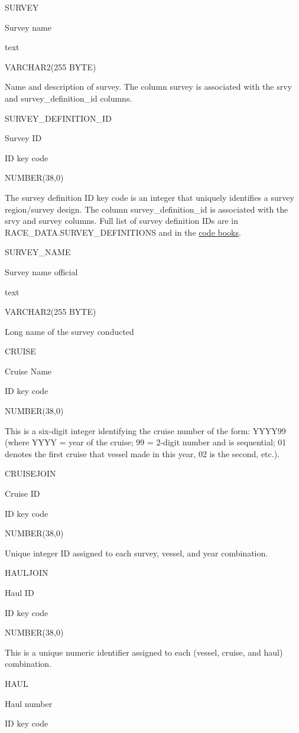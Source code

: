 \documentclass[
  letterpaper,
  oneside,
  open=any]{scrbook}
\begin{document}
SURVEY

Survey name

text

VARCHAR2(255 BYTE)

Name and description of survey. The column survey is associated with the
srvy and survey\_definition\_id columns.

SURVEY\_DEFINITION\_ID

Survey ID

ID key code

NUMBER(38,0)

The survey definition ID key code is an integer that uniquely identifies
a survey region/survey design. The column survey\_definition\_id is
associated with the srvy and survey columns. Full list of survey
definition IDs are in RACE\_DATA.SURVEY\_DEFINITIONS and in the
\href{https://www.fisheries.noaa.gov/resource/document/groundfish-survey-species-code-manual-and-data-codes-manual}{code
books}.

SURVEY\_NAME

Survey name official

text

VARCHAR2(255 BYTE)

Long name of the survey conducted

CRUISE

Cruise Name

ID key code

NUMBER(38,0)

This is a six-digit integer identifying the cruise number of the form:
YYYY99 (where YYYY = year of the cruise; 99 = 2-digit number and is
sequential; 01 denotes the first cruise that vessel made in this year,
02 is the second, etc.).

CRUISEJOIN

Cruise ID

ID key code

NUMBER(38,0)

Unique integer ID assigned to each survey, vessel, and year combination.

HAULJOIN

Haul ID

ID key code

NUMBER(38,0)

This is a unique numeric identifier assigned to each (vessel, cruise,
and haul) combination.

HAUL

Haul number

ID key code
\end{document}
